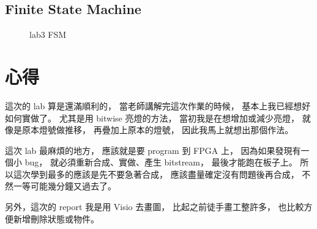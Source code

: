 \documentclass{article}
\begin{document}
\begin{CJK}{UTF8}{bsmi}
\subsection{Finite State Machine}
\begin{figure}[h]
\caption{lab3 FSM}
\end{figure}
\section{心得}
這次的 lab 算是還滿順利的，
當老師講解完這次作業的時候，
基本上我已經想好如何實做了。
尤其是用 bitwise 亮燈的方法，
當初我是在想增加或減少亮燈，
就像是原本燈號做推移，
再疊加上原本的燈號，
因此我馬上就想出那個作法。

這次 lab 最麻煩的地方，
應該就是要 program 到 FPGA 上，
因為如果發現有一個小 bug，
就必須重新合成、實做、產生 bitstream，
最後才能跑在板子上。
所以這次學到最多的應該是先不要急著合成，
應該盡量確定沒有問題後再合成，
不然一等可能幾分鐘又過去了。

另外，這次的 report 我是用 Visio 去畫圖，
比起之前徒手畫工整許多，
也比較方便新增刪除狀態或物件。
\end{CJK}
\end{document}
